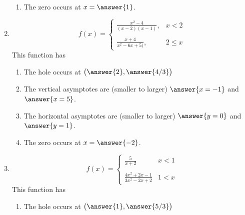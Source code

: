 \documentclass{ximera}
\begin{document}
\begin{exercise}
\begin{enumerate}
\begin{exercise}
\begin{enumerate}
\item The zero occurs at $x=\answer{1}$.
\end{enumerate}
\end{exercise}

\item \begin{equation*}
	f(x) = \begin{cases}
		\frac{x^2-4}{(x-2)(x-1)},  & x <2 \\
		\\
		\frac{x+4}{x^2-6x+5)},  & 2 \leq x 
		\end{cases}
		\end{equation*}
This function has
\begin{selectAll}
\end{selectAll}
%
\begin{exercise}
\begin{enumerate}
\item The hole occurs at $\big(\answer{2},\answer{4/3}\big)$

\item The vertical asymptotes are (smaller to larger) $\answer{x=-1}$ and $\answer{x=5}$.

\item The horizontal asymptotes are (smaller to larger) $\answer{y=0}$ and $\answer{y=1}$.

\item The zero occurs at $x=\answer{-2}$.
\end{enumerate}
\end{exercise}

\item \begin{equation*}
	f(x) = \begin{cases}
		\frac{5}{x+2}  &  x < 1 \\
		\\
		\frac{4x^2+2x-1}{3x^2-2x+2}  & 1< x 
		\end{cases}
		\end{equation*}
This function has
\begin{selectAll}
\end{selectAll}
%
\begin{exercise}
\begin{enumerate}
\item The hole occurs at $\big(\answer{1},\answer{5/3}\big)$


\end{enumerate}
\end{exercise}
\end{enumerate}
\end{exercise}
\end{document}
